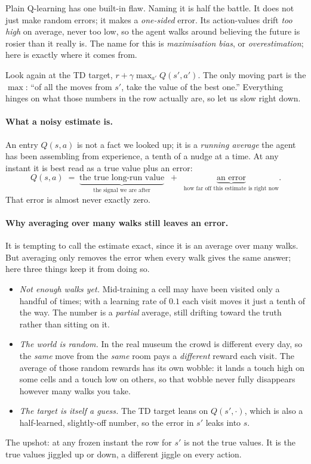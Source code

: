 \documentclass[11pt]{article}
\newcommand{\key}[1]{\textit{#1}}            %
\begin{document}
Plain Q-learning has one built-in flaw. Naming it is half the battle. It does not just
make random errors; it makes a \emph{one-sided} error. Its action-values drift \emph{too high}
on average, never too low, so the agent walks around believing the future is rosier than it
really is. The name for this is \key{maximisation bias}, or \key{overestimation}; here is
exactly where it comes from.

Look again at the TD target, $r + \gamma \max_{a'} Q(s',a')$. The only moving part is the
$\max$: ``of all the moves from $s'$, take the value of the best one.'' Everything hinges on what
those numbers in the row actually are, so let us slow right down.

\paragraph{What a noisy estimate is.} An entry $Q(s,a)$ is not a fact we looked up; it
is a \emph{running average} the agent has been assembling from experience, a tenth of a nudge at a
time. At any instant it is best read as a true value plus an error:
\[
Q(s,a)\;=\;\underbrace{\text{the true long-run value}}_{\text{the signal we are after}}\;\;+\;\;\underbrace{\text{an error}}_{\text{how far off this estimate is right now}}.
\]
That error is almost never exactly zero.

\paragraph{Why averaging over many walks still leaves an error.} It is tempting to call the
estimate exact, since it is an average over many walks. But averaging only removes the error when every
walk gives the same answer; here three things keep it from doing so.
\begin{itemize}[leftmargin=1.4em,itemsep=2pt]
\item \emph{Not enough walks yet.} Mid-training a cell may have been visited only a handful of times;
with a learning rate of $0.1$ each visit moves it just a tenth of the way. The number is a
\emph{partial} average, still drifting toward the truth rather than sitting on it.
\item \emph{The world is random.} In the real museum the crowd is different every day, so the
\emph{same} move from the \emph{same} room pays a \emph{different} reward each visit. The average of
those random rewards has its own wobble: it lands a touch high on some cells and a touch low on
others, so that wobble never fully disappears however many walks you take.
\item \emph{The target is itself a guess.} The TD target leans on $Q(s',\cdot)$, which is also a
half-learned, slightly-off number, so the error in $s'$ leaks into $s$.
\end{itemize}
The upshot: at any frozen instant the row for $s'$ is not the true values. It is the true values
jiggled up or down, a different jiggle on every action.
\end{document}

